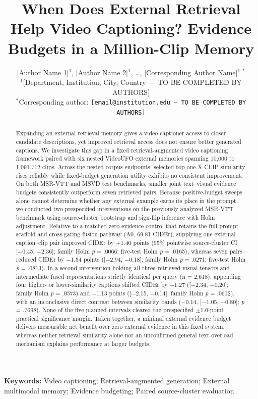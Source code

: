 \documentclass[11pt,a4paper]{article}
\title{\textbf{When Does External Retrieval Help Video Captioning? Evidence Budgets in a Million-Clip Memory}}
\author{[Author Name 1]$^{1}$, [Author Name 2]$^{1}$, \ldots, [Corresponding Author Name]$^{1,*}$\\[4pt]
\small $^{1}$[Department, Institution, City, Country --- TO BE COMPLETED BY AUTHORS]\\
\small $^{*}$Corresponding author: \texttt{[email@institution.edu --- TO BE COMPLETED BY AUTHORS]}}
\date{}
\begin{document}
\maketitle

\begin{abstract}
Expanding an external retrieval memory gives a video captioner access to closer candidate descriptions, yet improved retrieval access does not ensure better generated captions. We investigate this gap in a fixed retrieval-augmented video captioning framework paired with six nested VideoUFO external memories spanning 10,000 to 1,091,712 clips. Across the nested corpus endpoints, selected top-one X-CLIP similarity rises reliably while fixed-budget generation utility exhibits no consistent improvement. On both MSR-VTT and MSVD test benchmarks, smaller joint text--visual evidence budgets consistently outperform seven retrieved pairs. Because positive-budget sweeps alone cannot determine whether any external example earns its place in the prompt, we conducted two prespecified interventions on the previously analyzed MSR-VTT benchmark using source-cluster bootstrap and sign-flip inference with Holm adjustment. Relative to a matched zero-evidence control that retains the full prompt scaffold and cross-gating fusion pathway (A0, 69.81 CIDEr), supplying one external caption--clip pair improved CIDEr by +1.40 points (95\% pointwise source-cluster CI [+0.45, +2.36]; family Holm \emph{p} = .0066; five-test Holm \emph{p} = .0165), whereas seven pairs reduced CIDEr by $-$1.54 points ([$-$2.94, $-$0.18]; family Holm \emph{p} = .0271; five-test Holm \emph{p} = .0813). In a second intervention holding all three retrieved visual tensors and intermediate fused representations strictly identical per query (n = 2,618), appending four higher- or lower-similarity captions shifted CIDEr by $-$1.27 ([$-$2.34, $-$0.20]; family Holm \emph{p} = .0573) and $-$1.13 points ([$-$2.15, $-$0.14]; family Holm \emph{p} = .0612), with an inconclusive direct contrast between similarity bands ($-$0.14, [$-$1.05, +0.80]; \emph{p} = .7698). None of the five planned intervals cleared the prespecified $\pm$1.0-point practical significance margin. Taken together, a minimal external evidence budget delivers measurable net benefit over zero external evidence in this fixed system, whereas neither retrieval similarity alone nor an unconfirmed general text-overload mechanism explains performance at larger budgets.
\end{abstract}
\noindent\textbf{Keywords:} Video captioning; Retrieval-augmented generation; External multimodal memory; Evidence budgeting; Paired source-cluster evaluation
\end{document}
